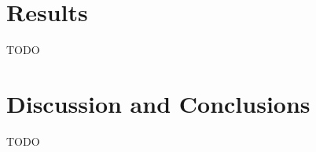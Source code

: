 \documentclass[twocolumn]{aastex631}
\begin{document}
\section{Results}\label{sec:results}
TODO

\section{Discussion and Conclusions}\label{sec:discussion}
TODO


\end{document}
